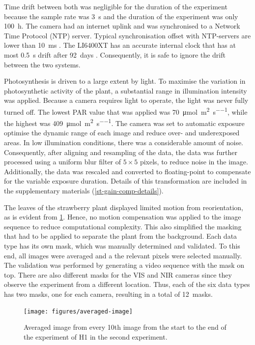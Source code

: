 \documentclass[10pt,authoryear,a4paper]{elsarticle}
\begin{document}
        Time drift between both was negligible for the duration of the experiment because the sample rate was \SI{3}{\second} and the duration of the experiment was only \SI{100}{\hour}. The camera had an internet uplink and was synchronised to a Network Time Protocol (NTP) server. Typical synchronisation offset with NTP-servers are lower than \SI{10}{\milli\second} \citep{marouaniInternal2008}. The LI6400XT has an accurate internal clock that has at most \SI{0.5}{\second} drift after 92~days \citep{li-corinc.Using2012}. Consequently, it is safe to ignore the drift between the two systems.
        
        Photosynthesis is driven to a large extent by light. To maximise the variation in photosynthetic activity of the plant, a substantial range in illumination intensity was applied. Because a camera requires light to operate, the light was never fully turned off. The lowest PAR value that was applied was \SI{70}{\micro\mole \per\square\metre \per\second}, while the highest was \SI{409}{\micro\mole \per\square\metre \per\second}. The camera was set to automatic exposure optimise the dynamic range of each image and reduce over- and underexposed areas. In low illumination conditions, there was a considerable amount of noise. Consequently, after aligning and resampling of the data, the data was further processed using a uniform blur filter of $5\times5$ pixels, to reduce noise in the image. Additionally, the data was rescaled and converted to floating-point to compensate for the variable exposure duration. Details of this transformation are included in the supplementary materials (\cref{st-gain-comp-details}).
        
        The leaves of the strawberry plant displayed limited motion from reorientation, as is evident from  \cref{averaged-image}. Hence, no motion compensation was applied to the image sequence to reduce computational complexity. This also simplified the masking that had to be applied to separate the plant from the background. Each data type has its own mask, which was manually determined and validated. To this end, all images were averaged and a the relevant pixels were selected manually. The validation was performed by generating a video sequence with the mask on top. There are also different masks for the VIS and NIR cameras since they observe the experiment from a different location. Thus, each of the six data types has two masks, one for each camera, resulting in a total of 12~masks.
        
        \begin{figure}[thb]
            \centering
            \texttt{[image: figures/averaged-image]}
            \caption{Averaged image from every 10th image from the start to the end of the experiment of H1 in the second experiment.}
            \label{averaged-image}
        \end{figure}
        
\end{document}
